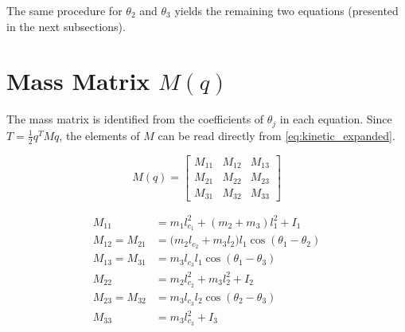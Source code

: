 \documentclass[11pt,a4paper]{article}
\newcommand{\vc}[1]{\bm{#1}}
\newcommand{\mat}[1]{\bm{#1}}
\newcommand{\dt}[1]{\dot{#1}}
\newcommand{\ddt}[1]{\ddot{#1}}
\def\vc#1{#1}%
\def\mat#1{#1}%
\def\dt#1{#1}%
\def\ddt#1{#1}%
\def\bm#1{#1}%
\begin{document}
The same procedure for $\theta_2$ and $\theta_3$ yields the remaining two equations
(presented in the next subsections).

\section{Mass Matrix \texorpdfstring{$\mat{M}(\vc{q})$}{M(q)}}
\label{sec:mass_matrix}

The mass matrix is identified from the coefficients of $\ddt{\theta}_j$ in each
equation. Since $T = \frac{1}{2}\dt{\vc{q}}^T \mat{M} \dt{\vc{q}}$, the elements
of $\mat{M}$ can be read directly from \cref{eq:kinetic_expanded}.

\begin{resultbox}
\begin{equation}
\mat{M}(\vc{q}) =
\begin{bmatrix}
    M_{11} & M_{12} & M_{13} \\
    M_{21} & M_{22} & M_{23} \\
    M_{31} & M_{32} & M_{33}
\end{bmatrix}
\label{eq:mass_matrix}
\end{equation}

\begin{align}
    M_{11} &= m_1 l_{c_1}^2 + (m_2 + m_3) l_1^2 + I_1 \label{eq:M11} \\[4pt]
    M_{12} = M_{21} &= \bigl(m_2 l_{c_2} + m_3 l_2\bigr) l_1 \cos(\theta_1 - \theta_2) \label{eq:M12} \\[4pt]
    M_{13} = M_{31} &= m_3 l_{c_3} l_1 \cos(\theta_1 - \theta_3) \label{eq:M13} \\[4pt]
    M_{22} &= m_2 l_{c_2}^2 + m_3 l_2^2 + I_2 \label{eq:M22} \\[4pt]
    M_{23} = M_{32} &= m_3 l_{c_3} l_2 \cos(\theta_2 - \theta_3) \label{eq:M23} \\[4pt]
    M_{33} &= m_3 l_{c_3}^2 + I_3 \label{eq:M33}
\end{align}
\end{resultbox}
\end{document}
